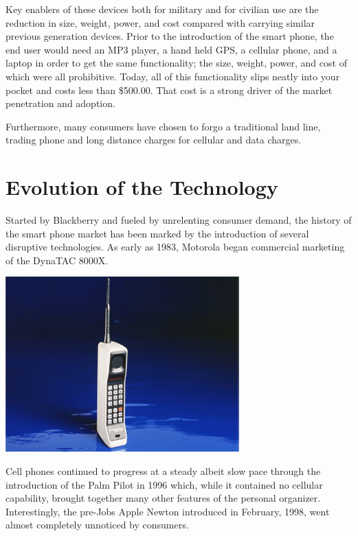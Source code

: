 \documentclass[letterpaper,12pt]{article}
\begin{document}
Key enablers of these devices both for military and for civilian use are the reduction in size, weight, power, and cost compared with carrying similar previous generation devices.  Prior to the introduction of the smart phone, the end user would need an MP3 player, a hand held GPS, a cellular phone, and a laptop in order to get the same functionality; the size, weight, power, and cost of which were all prohibitive.  Today, all of this functionality slips neatly into your pocket and costs less than \$500.00.  That cost is a strong driver of the market penetration and adoption.

Furthermore, many consumers have chosen to forgo a traditional land line, trading phone and long distance charges for cellular and data charges.

\section*{Evolution of the Technology}
Started by Blackberry and fueled by unrelenting consumer demand, the history of the smart phone market has been marked by the introduction of several disruptive technologies.  As early as 1983, Motorola began commercial marketing of the DynaTAC 8000X.  

\begin{center}
\includegraphics[scale=0.7]{images/dynaTac8000}
\end{center}

Cell phones continued to progress at a steady albeit slow pace through the introduction of the Palm Pilot in 1996 which, while it contained no cellular capability, brought together many other features of the personal organizer.  Interestingly, the pre-Jobs Apple Newton introduced in February, 1998, went almost completely unnoticed by consumers.  
\end{document}
